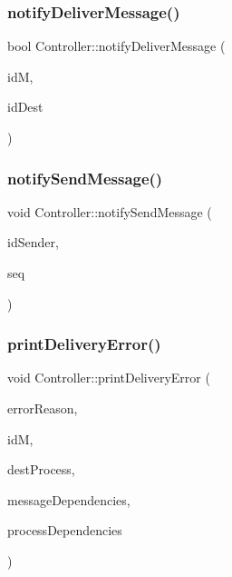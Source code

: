 \subsubsection{\texorpdfstring{notify\+Deliver\+Message()}{notifyDeliverMessage()}}
{\footnotesize\ttfamily bool Controller\+::notify\+Deliver\+Message (\begin{DoxyParamCaption}\item[{\hyperlink{structures_8h_a83a1d9a070efa5341da84cfd8e28d3e5}{id\+Msg}}]{idM,  }\item[{unsigned int}]{id\+Dest }\end{DoxyParamCaption})}

\mbox{\label{classController_a7207304a07534e50a690f26c765b4a71}} 
\subsubsection{\texorpdfstring{notify\+Send\+Message()}{notifySendMessage()}}
{\footnotesize\ttfamily void Controller\+::notify\+Send\+Message (\begin{DoxyParamCaption}\item[{unsigned int}]{id\+Sender,  }\item[{unsigned int}]{seq }\end{DoxyParamCaption})}

\mbox{\label{classController_ad43f12368786278dd1171226b666395d}} 
\subsubsection{\texorpdfstring{print\+Delivery\+Error()}{printDeliveryError()}}
{\footnotesize\ttfamily void Controller\+::print\+Delivery\+Error (\begin{DoxyParamCaption}\item[{string}]{error\+Reason,  }\item[{\hyperlink{structures_8h_a83a1d9a070efa5341da84cfd8e28d3e5}{id\+Msg}}]{idM,  }\item[{unsigned int}]{dest\+Process,  }\item[{const \hyperlink{classTotalDependencies}{Total\+Dependencies} \&}]{message\+Dependencies,  }\item[{const \hyperlink{classTotalDependencies}{Total\+Dependencies} \&}]{process\+Dependencies }\end{DoxyParamCaption})\hspace{0.3cm}{\ttfamily [private]}}

